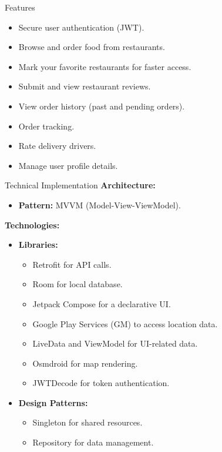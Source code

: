 \documentclass{beamer}
\begin{document}
\begin{frame}{Features}
    \begin{itemize}
        \item Secure user authentication (JWT).
              \vspace{0.3cm}
        \item Browse and order food from restaurants.
              \vspace{0.3cm}
        \item Mark your favorite restaurants for faster access.
              \vspace{0.3cm}
        \item Submit and view restaurant reviews.
              \vspace{0.3cm}
        \item View order history (past and pending orders).
              \vspace{0.3cm}
        \item Order tracking.
              \vspace{0.3cm}
        \item Rate delivery drivers.
              \vspace{0.3cm}
        \item Manage user profile details.
    \end{itemize}
\end{frame}

\begin{frame}{Technical Implementation}
    \textbf{Architecture:}
    \begin{itemize}
        \item \textbf{Pattern:} MVVM (Model-View-ViewModel).
    \end{itemize}
    \textbf{Technologies:}
    \begin{itemize}
        \item \textbf{Libraries:}
              \begin{itemize}
                  \item Retrofit for API calls.
                  \item Room for local database.
                  \item Jetpack Compose for a declarative UI.
                  \item Google Play Services (GM) to access location data.
                  \item LiveData and ViewModel for UI-related data.
                  \item Osmdroid for map rendering.
                  \item JWTDecode for token authentication.
              \end{itemize}
        \item \textbf{Design Patterns:}
              \begin{itemize}
                  \item Singleton for shared resources.
                  \item Repository for data management.
              \end{itemize}
    \end{itemize}
\end{frame}
\end{document}
